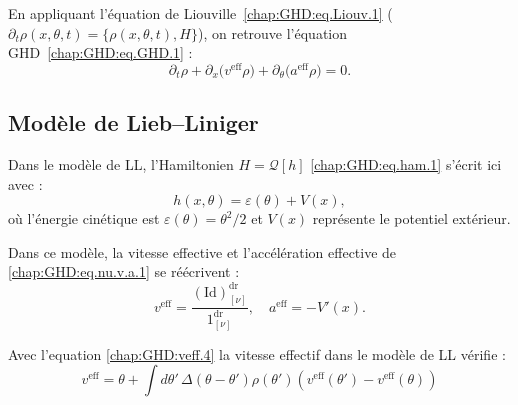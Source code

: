 {\color{blue}
En appliquant l’équation de Liouville~\eqref{chap:GHD:eq.Liouv.1} ($\partial_t \rho(x,\theta,t) = \{\rho(x,\theta,t), H\}$), on retrouve l’équation \gls{GHD}~\eqref{chap:GHD:eq.GHD.1}%
:
\begin{equation*}\label{chap:GHD:eq.conserv.3}
	\partial_t \rho + \partial_x \big( v^{\mathrm{eff}} \rho \big)
	+ \partial_\theta \big( a^{\mathrm{eff}} \rho \big) = 0.
\end{equation*}

}




\subsection{Modèle de Lieb–Liniger}

Dans le modèle de \gls{LL}, l’Hamiltonien $H = \mathcal{Q}[h]$ \eqref{chap:GHD:eq.ham.1} s’écrit ici avec :
\begin{equation}\label{chap:GHD:eq.ham.2}
	h(x , \theta ) = \varepsilon(\theta) + V(x),
\end{equation}
où l’énergie cinétique est $\varepsilon(\theta) = \theta^2 / 2$ et $V(x)$ représente le potentiel extérieur.

\medskip

Dans ce modèle, la vitesse effective et l’accélération effective de \eqref{chap:GHD:eq.nu.v.a.1} se réécrivent :
\begin{equation}\label{chap:GHD:eq.nu.v.a.1.1111}
	v^{\mathrm{eff}} = \frac{(\mathrm{Id})^{\mathrm{dr}}_{[\nu]}}{1^{\mathrm{dr}}_{[\nu]}}, 
	\quad a^{\mathrm{eff}} = - V'(x).
\end{equation}

Avec l'equation \eqref{chap:GHD:veff.4} la vitesse effectif dans le modèle de \gls{LL} vérifie : 
\begin{equation}
	v^{\mathrm{eff}} = \theta +	\int d \theta' \, \Delta(\theta - \theta') \rho ( \theta') ( v^{\mathrm{eff}} ( \theta' ) - v^{\mathrm{eff}} ( \theta )  ) 
\end{equation}


